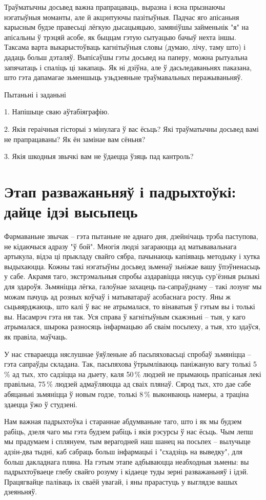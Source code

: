 Траўматычны досьвед важна прапрацаваць, выразна і ясна прызнаючы нэгатыўныя моманты, але й акцэнтуючы пазітыўныя. Падчас яго апісаньня карысным будзе правесьці лёгкую дысацыяцыю, замяніўшы займеньнік "я" на апісальны ў трэцяй асобе, як быццам гэтую сытуацыю бачыў нехта іншы. Таксама варта выкарыстоўваць кагнітыўныя словы (думаю, лічу, таму што) і дадаць больш дэталяў. Выпісаўшы гэты досьвед на паперу, можна рытуальна запячатаць і спаліць ці закапаць. Як ні дзіўна, але ў дасьледаваньнях паказана, што гэта дапамагае зьменшыць узьдзеяньне траўмавальных перажываньняў.

Пытаньні і заданьні

1. Напішыце сваю аўтабіяграфію.

2. Якія гераічныя гісторыі з мінулага ў вас ёсьць? Які траўматычны досьвед вамі не прапрацаваны? Як ён замінае вам сёньня?

3. Якія шкодныя звычкі вам не ўдаецца ўзяць пад кантроль?


\section{Этап разважаньняў і падрыхтоўкі: дайце ідэі высьпець}

Фармаваньне звычак – гэта пытаньне не аднаго дня, дзейнічаць трэба паступова, не кідаючыся адразу "ў бой". Многія людзі загараюцца ад матывавальнага артыкула, відэа ці прыкладу свайго сябра, пачынаюць капіяваць методыку і хутка выдыхаюцца. Кожны такі нэгатыўны досьвед зьменаў зьніжае вашу ўпэўненасьць у сабе. Акрамя таго, экстрэмальныя спробы аздаравіцца нясуць сур'ёзныя рызыкі для здароўя. Зьмяніцца лёгка, галоўнае захацець па-сапраўднаму – такі лозунг мы можам пачуць ад розных коўчаў і матыватараў асобаснага росту. Яны ж сьцьвярджаюць, што калі ў вас не атрымалася, то вінаватыя ў гэтым вы і толькі вы. Насамрэч гэта ня так. Уся справа ў кагнітыўным скажэньні – тыя, у каго атрымалася, шырока разносяць інфармацыю аб сваім посьпеху, а тыя, хто здаўся, як правіла, маўчаць.

У нас ствараецца няслушнае ўяўленьне аб пасьпяховасьці спробаў зьмяніцца – гэта сапраўды складана. Так, пасьпяхова ўтрымліваюць паніжаную вагу толькі 5\,\% ад тых, хто садзіцца на дыету, каля 50\,\% людзей не прымаюць прапісаныя лекі правільна, 75\,\% людзей адмаўляюцца ад сваіх плянаў. Сярод тых, хто дае сабе абяцаньні зьмяніцца ў новым годзе, толькі 8\,\% выконваюць намеры, а траціна здаецца ўжо ў студзені.

Нам важная падрыхтоўка і стараннае абдумваньне таго, што і як мы будзем рабіць, дзеля чаго мы гэта будзем рабіць і якія рэсурсы ў нас ёсьць. Чым лепш мы прадумаем і сплянуем, тым верагодней наш шанец на посьпех – вылучыце адзін-два тыдні, каб сабраць больш інфармацыі і "схадзіць на выведку", для больш дакладнага пляна. На гэтым этапе адбываюцца неабходныя зьмены: вы падрыхтоўваеце глебу свайго розуму і кідаеце туды зерні разважаньняў і ідэй. Працягвайце паліваць іх сваёй увагай, і яны прарастуць у выглядзе вашых дзеяньняў.

